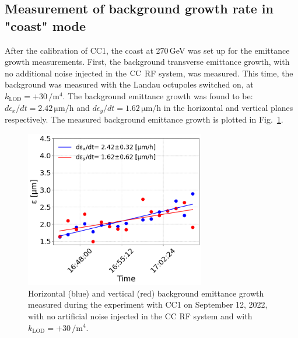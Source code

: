 \subsection{Measurement of background growth rate in "coast" mode}
After the calibration of CC1, the coast at 270\,GeV was set up for the emittance growth measurements. First, the background transverse emittance growth, with no additional noise injected in the ${\mathrm{CC}}$ RF system, was measured. This time, the background was measured with the Landau octupoles switched on, at $k_\mathrm{LOD}=+30$\,$\mathrm{/m^4}$. The background emittance growth was found to be: $d\epsilon_x/dt=2.42$\,$\mathrm{\mu m/h}$ and $d\epsilon_y/dt=1.62$\,$\mathrm{\mu m/h}$ in the horizontal and vertical planes respectively. The measured background emittance growth is plotted in Fig.~\ref{fig:H_V_emit_growth_background_subtracted_octupole_scan_sep22}.


\begin{figure}[!h]
   \centering         
   \includegraphics[width=0.7\textwidth]{images/Ch8/cc_md_12sep22_backg_coast3.png}
       \caption{Horizontal (blue) and vertical (red) background emittance growth measured during the experiment with CC1 on September 12, 2022, with no artificial noise injected in the CC RF system and with $k_\mathrm{LOD}=+30$\,$\mathrm{/m^4}$.}
       \label{fig:H_V_emit_growth_background_subtracted_octupole_scan_sep22}
\end{figure}

